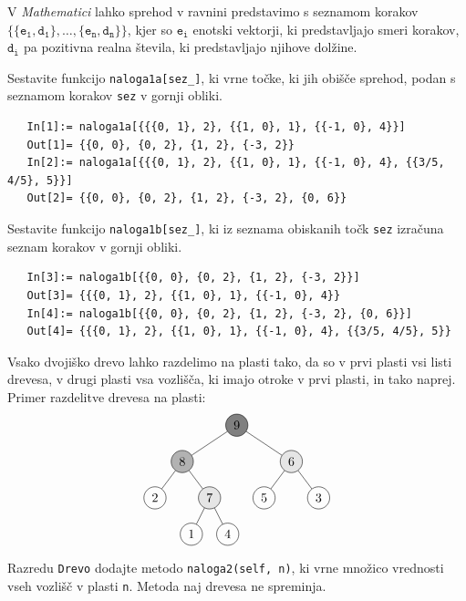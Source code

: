 \documentclass[arhiv]{izpit}
\begin{document}

\naloga[25 točk]

V \emph{Mathematici} lahko sprehod v ravnini predstavimo s seznamom korakov
$\mathtt{\{\{e_1, d_1\}, \dots, \{e_n, d_n\}\}}$,
  kjer so $\mathtt{e_i}$ enotski vektorji, ki predstavljajo smeri korakov,
  $\mathtt{d_i}$ pa pozitivna realna števila, ki predstavljajo njihove dolžine.

\podnaloga
Sestavite funkcijo \verb|naloga1a[sez_]|,
  ki vrne točke, ki jih obišče sprehod,
  podan s seznamom korakov \verb|sez| v gornji obliki.

{\small\begin{verbatim}
   In[1]:= naloga1a[{{{0, 1}, 2}, {{1, 0}, 1}, {{-1, 0}, 4}}]
   Out[1]= {{0, 0}, {0, 2}, {1, 2}, {-3, 2}}
   In[2]:= naloga1a[{{{0, 1}, 2}, {{1, 0}, 1}, {{-1, 0}, 4}, {{3/5, 4/5}, 5}}]
   Out[2]= {{0, 0}, {0, 2}, {1, 2}, {-3, 2}, {0, 6}}\end{verbatim}}

\podnaloga
Sestavite funkcijo \verb|naloga1b[sez_]|,
  ki iz seznama obiskanih točk \verb|sez| izračuna
  seznam korakov v gornji obliki.

{\small\begin{verbatim}
   In[3]:= naloga1b[{{0, 0}, {0, 2}, {1, 2}, {-3, 2}}]
   Out[3]= {{{0, 1}, 2}, {{1, 0}, 1}, {{-1, 0}, 4}}
   In[4]:= naloga1b[{{0, 0}, {0, 2}, {1, 2}, {-3, 2}, {0, 6}}]
   Out[4]= {{{0, 1}, 2}, {{1, 0}, 1}, {{-1, 0}, 4}, {{3/5, 4/5}, 5}}\end{verbatim}}

\naloga[25 točk]

Vsako dvojiško drevo lahko razdelimo na plasti tako,
  da so v prvi plasti vsi listi drevesa,
  v drugi plasti vsa vozlišča, ki imajo otroke v prvi plasti,
  in tako naprej.
Primer razdelitve drevesa na plasti:
\[
  \begin{tikzpicture}[level distance=1cm,
    level 1/.style={sibling distance=3cm},
    level 2/.style={sibling distance=1.5cm},
    level 3/.style={sibling distance=1cm}
    ]
    \node[circle, draw, fill=black!50] (d) {9}
      child {node[circle, draw, fill=black!30] {8}
        child {node[circle, draw] {2}}
        child {node[circle, draw, fill=black!10] {7}
          child {node[circle, draw] {1}}
          child {node[circle, draw] {4}}
        }
      }
      child {node[circle, draw, fill=black!10] {6}
        child {node[circle, draw] {5}}
        child {node[circle, draw] {3}}
      };
  \end{tikzpicture}
\]
%
Razredu \verb|Drevo| dodajte metodo \verb|naloga2(self, n)|,
  ki vrne množico vrednosti vseh vozlišč v plasti \verb|n|.
Metoda naj drevesa ne spreminja.
\end{document}
